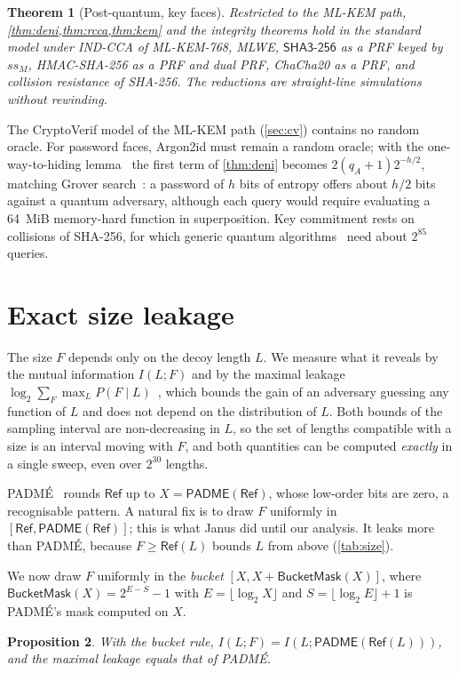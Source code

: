 \documentclass[11pt,a4paper]{article}
\newtheorem{theorem}{Theorem}
\newtheorem{proposition}[theorem]{Proposition}
\theoremstyle{definition}
\theoremstyle{remark}
\newcommand{\RefSz}{\mathsf{Ref}}
\newcommand{\padme}{\mathsf{PADME}}
\newcommand{\bmask}{\mathsf{BucketMask}}
\newcommand{\SHA}{\mathsf{SHA3\text{-}256}}
\begin{document}
\begin{theorem}[Post-quantum, key faces]
Restricted to the ML-KEM path, \cref{thm:deni,thm:rcca,thm:kem} and the integrity theorems hold in the standard model under IND-CCA of ML-KEM-768, MLWE, $\SHA$ as a PRF keyed by $ss_M$, HMAC-SHA-256 as a PRF and dual PRF, ChaCha20 as a PRF, and collision resistance of SHA-256. The reductions are straight-line simulations without rewinding.
\end{theorem}

The CryptoVerif model of the ML-KEM path (\cref{sec:cv}) contains no random oracle. For password faces, Argon2id must remain a random oracle; with the one-way-to-hiding lemma~\cite{o2h} the first term of \cref{thm:deni} becomes $2(q_A+1)2^{-h/2}$, matching Grover search~\cite{grover}: a password of $h$ bits of entropy offers about $h/2$ bits against a quantum adversary, although each query would require evaluating a 64~MiB memory-hard function in superposition. Key commitment rests on collisions of SHA-256, for which generic quantum algorithms~\cite{bht} need about $2^{85}$ queries.

\section{Exact size leakage}
\label{sec:size}

The size $F$ depends only on the decoy length $L$. We measure what it reveals by the mutual information $I(L;F)$ and by the maximal leakage $\log_2\sum_F\max_L P(F\mid L)$~\cite{maxleak}, which bounds the gain of an adversary guessing any function of $L$ and does not depend on the distribution of $L$. Both bounds of the sampling interval are non-decreasing in $L$, so the set of lengths compatible with a size is an interval moving with $F$, and both quantities can be computed \emph{exactly} in a single sweep, even over $2^{30}$ lengths.

PADM\'E~\cite{purbs} rounds $\RefSz$ up to $X = \padme(\RefSz)$, whose low-order bits are zero, a recognisable pattern. A natural fix is to draw $F$ uniformly in $[\RefSz, \padme(\RefSz)]$; this is what Janus did until our analysis. It leaks more than PADM\'E, because $F\ge\RefSz(L)$ bounds $L$ from above (\cref{tab:size}).

We now draw $F$ uniformly in the \emph{bucket} $[X, X+\bmask(X)]$, where $\bmask(X) = 2^{E-S}-1$ with $E=\lfloor\log_2 X\rfloor$ and $S=\lfloor\log_2 E\rfloor+1$ is PADM\'E's mask computed on $X$.

\begin{proposition}
With the bucket rule, $I(L;F) = I(L;\padme(\RefSz(L)))$, and the maximal leakage equals that of PADM\'E.
\end{proposition}
\end{document}
